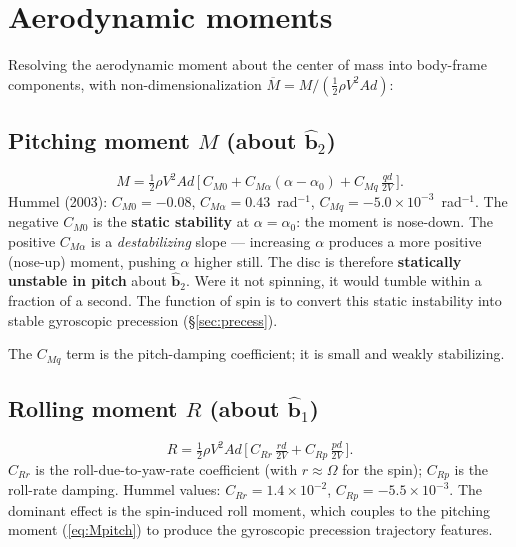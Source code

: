 \documentclass[11pt,letterpaper]{article}
\begin{document}
\section{Aerodynamic moments}

Resolving the aerodynamic moment about the center of mass into body-frame components, with non-dimensionalization $\overline{M} = M / (\tfrac{1}{2}\rho V^2 A d)$:

\subsection{Pitching moment $M$ (about $\hat{\mathbf{b}}_2$)}

\begin{equation}
M = \tfrac{1}{2}\rho V^2 A d\,\Big[\,C_{M0} + C_{M\alpha}(\alpha - \alpha_0) + C_{Mq}\,\tfrac{q d}{2V}\,\Big].
\label{eq:Mpitch}
\end{equation}
Hummel (2003): $C_{M0} = -0.08$, $C_{M\alpha} = 0.43$~rad$^{-1}$, $C_{Mq} = -5.0\times10^{-3}$~rad$^{-1}$. The negative $C_{M0}$ is the \textbf{static stability} at $\alpha = \alpha_0$: the moment is nose-down. The positive $C_{M\alpha}$ is a \emph{destabilizing} slope --- increasing $\alpha$ produces a more positive (nose-up) moment, pushing $\alpha$ higher still. The disc is therefore \textbf{statically unstable in pitch} about $\hat{\mathbf{b}}_2$. Were it not spinning, it would tumble within a fraction of a second. The function of spin is to convert this static instability into stable gyroscopic precession (\S\ref{sec:precess}).

The $C_{Mq}$ term is the pitch-damping coefficient; it is small and weakly stabilizing.

\subsection{Rolling moment $R$ (about $\hat{\mathbf{b}}_1$)}

\begin{equation}
R = \tfrac{1}{2}\rho V^2 A d\,\Big[\,C_{Rr}\,\tfrac{r d}{2V} + C_{Rp}\,\tfrac{p d}{2V}\,\Big].
\label{eq:Rroll}
\end{equation}
$C_{Rr}$ is the roll-due-to-yaw-rate coefficient (with $r \approx \Omega$ for the spin); $C_{Rp}$ is the roll-rate damping. Hummel values: $C_{Rr} = 1.4\times10^{-2}$, $C_{Rp} = -5.5\times10^{-3}$. The dominant effect is the spin-induced roll moment, which couples to the pitching moment (\ref{eq:Mpitch}) to produce the gyroscopic precession trajectory features.
\end{document}

